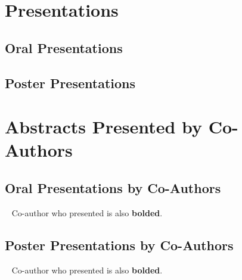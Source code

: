 \documentclass[%
]{komacv}
\begin{document}
\section{Presentations}

\subsection{Oral Presentations}

\begin{refcontext}[]
\nocite{*}
\printbibliography[keyword=talk, heading=none, resetnumbers=true]
\end{refcontext}

\subsection{Poster Presentations}

\begin{refcontext}[]
\nocite{*}
\printbibliography[keyword=poster, heading=none, resetnumbers=true]
\end{refcontext}

\section{Abstracts Presented by Co-Authors}

\subsection{Oral Presentations by Co-Authors}
~
{\small Co-author who presented is also \textbf{bolded}.}

\begin{refcontext}[]
\nocite{*}
\printbibliography[keyword=talk-coauthor, heading=none, resetnumbers=true]
\end{refcontext}

\subsection{Poster Presentations by Co-Authors}
~
{\small Co-author who presented is also \textbf{bolded}.}

\begin{refcontext}[]
\nocite{*}
\printbibliography[keyword=poster-coauthor, heading=none, resetnumbers=true]
\end{refcontext}
\end{document}
